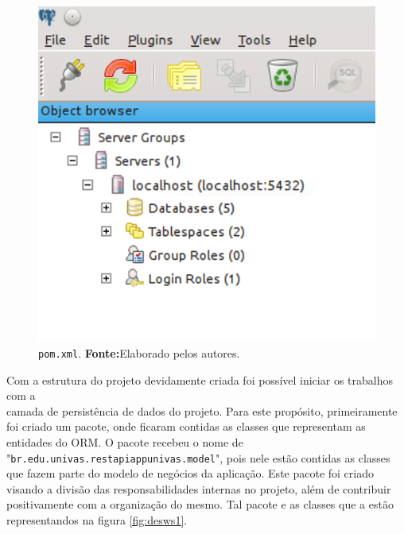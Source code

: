 \begin{figure}[h!]
	\centerline{\includegraphics[scale=0.8]{./imagens/2_q_metodologico/4_procedimentos_resultados/43_webservice/432_desenvolvimento/desws.png}}
	\caption[\texttt{pom.xml}]{\texttt{pom.xml}.
		\textbf{Fonte:}Elaborado pelos autores.}
	\label{fig:desws}
\end{figure}

	

	\par Com a estrutura do projeto devidamente criada foi possível iniciar os
trabalhos com a \\ camada de persistência de dados do projeto. Para este
propósito, primeiramente foi criado um pacote, onde ficaram contidas as classes
que representam as entidades do ORM. O pacote recebeu o nome de
"\texttt{br.edu.univas.restapiappunivas.model}", pois nele estão contidas as
classes que fazem parte do modelo de negócios da aplicação. Este pacote foi
criado visando a divisão das responsabilidades internas no projeto, além de
contribuir positivamente com a organização do mesmo. Tal pacote e as classes
que a estão representandos na figura \ref{fig:desws1}.

